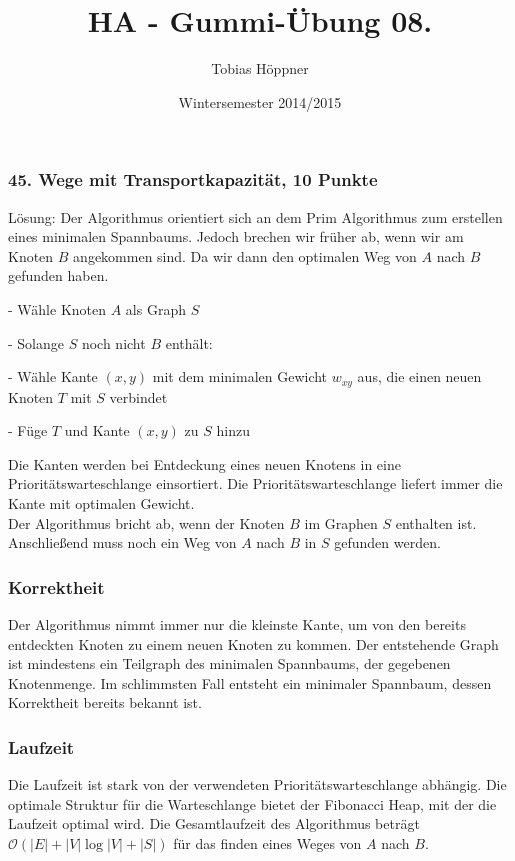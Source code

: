 \documentclass[ngerman,a4paper]{report}
\author{Tobias Höppner}
\title{HA - Gummi-Übung 08.}
\date{Wintersemester 2014/2015}
\renewcommand{\maketitle}{}
\begin{document}
 
\maketitle 

\subsubsection*{45. Wege mit Transportkapazität, 10 Punkte}
Lösung: Der Algorithmus orientiert sich an dem Prim Algorithmus zum erstellen eines minimalen Spannbaums.
Jedoch brechen wir früher ab, wenn wir am Knoten $B$ angekommen sind. Da wir dann den optimalen Weg von $A$ nach $B$ gefunden haben.\\
\begin{compactitem}
\item[-] Wähle Knoten $A$ als Graph $S$
\item[-] Solange $S$ noch nicht $B$ enthält:
\begin{compactitem}
\item[-] Wähle Kante $(x,y)$ mit dem minimalen Gewicht $w_{xy}$ aus, die einen neuen Knoten $T$ mit $S$ verbindet
\item[-] Füge $T$ und Kante $(x,y)$ zu $S$ hinzu\\
\end{compactitem}
\end{compactitem}
Die Kanten werden bei Entdeckung eines neuen Knotens in eine Prioritätswarteschlange einsortiert. Die Prioritätswarteschlange liefert immer die Kante mit optimalen Gewicht.\\
Der Algorithmus bricht ab, wenn der Knoten $B$ im Graphen $S$ enthalten ist. Anschließend muss noch ein Weg von $A$ nach $B$ in $S$ gefunden werden.\\

\subsubsection{Korrektheit}
Der Algorithmus nimmt immer nur die kleinste Kante, um von den bereits entdeckten Knoten zu einem neuen Knoten zu kommen. Der entstehende Graph ist mindestens ein Teilgraph des minimalen Spannbaums, der gegebenen Knotenmenge. Im schlimmsten Fall entsteht ein minimaler Spannbaum, dessen Korrektheit bereits bekannt ist.

\subsubsection*{Laufzeit}
Die Laufzeit ist stark von der verwendeten Prioritätswarteschlange abhängig. Die optimale Struktur für die Warteschlange bietet der Fibonacci Heap, mit der die Laufzeit optimal wird. Die Gesamtlaufzeit des Algorithmus beträgt $\mathcal{O}(|E| + |V| \log |V| + |S|)$ für das finden eines Weges von $A$ nach $B$.
\end{document}
